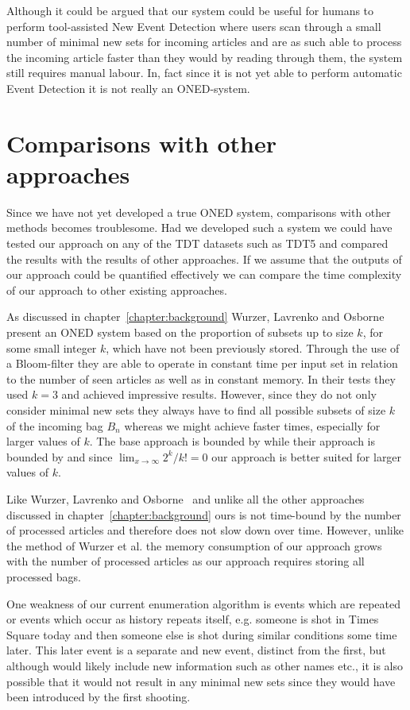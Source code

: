 Although it could be argued that our system could be useful for humans to perform tool-assisted New Event Detection where users scan through a small number of minimal new sets for incoming articles and are as such able to process the incoming article faster than they would by reading through them, the system still requires manual labour. In, fact since it is not yet able to perform automatic Event Detection it is not really an ONED-system.

\section{Comparisons with other approaches}
Since we have not yet developed a true ONED system, comparisons with other methods becomes troublesome. Had we developed such a system we could have tested our approach on any of the TDT datasets such as TDT5 and compared the results with the results of other approaches. If we assume that the outputs of our approach could be quantified effectively we can compare the time complexity of our approach to other existing approaches.

As discussed in chapter~\ref{chapter:background} Wurzer, Lavrenko and Osborne~\cite{wurzer2015kterm} present an ONED system based on the proportion of subsets up to size $k$, for some small integer $k$, which have not been previously stored. Through the use of a Bloom-filter they are able to operate in constant time per input set in relation to the number of seen articles as well as in constant memory. In their tests they used $k=3$ and achieved impressive results. However, since they do not only consider minimal new sets they always have to find all possible subsets of size $k$ of the incoming bag $B_{n}$ whereas we might achieve faster times, especially for larger values of $k$. The base approach is bounded by  while their approach is bounded by  and since $\lim_{x \to \infty}2^{k}/k!=0$ our approach is better suited for larger values of $k$. 

Like Wurzer, Lavrenko and Osborne~\cite{wurzer2015kterm} and unlike all the other approaches discussed in chapter~\ref{chapter:background} ours is not time-bound by the number of processed articles and therefore does not slow down over time. However, unlike the method of Wurzer et al. the memory consumption of our approach grows with the number of processed articles as our approach requires storing all processed bags. 

One weakness of our current enumeration algorithm is events which are repeated or events which occur as history repeats itself, e.g. someone is shot in Times Square today and then someone else is shot during similar conditions some time later. This later event is a separate and new event, distinct from the first, but although would likely include new information such as other names etc., it is also possible that it would not result in any minimal new sets since they would have been introduced by the first shooting.

